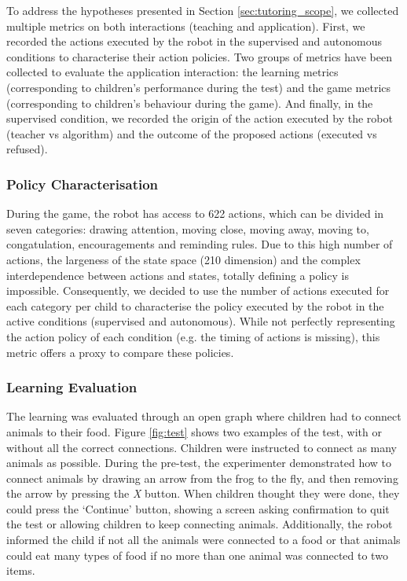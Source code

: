 To address the hypotheses presented in Section \ref{sec:tutoring_scope}, we collected multiple metrics on both interactions (teaching and application). First, we recorded the actions executed by the robot in the supervised and autonomous conditions to characterise their action policies. Two groups of metrics have been collected to evaluate the application interaction: the learning metrics (corresponding to children's performance during the test) and the game metrics (corresponding to children's behaviour during the game). And finally, in the supervised condition, we recorded the origin of the action executed by the robot (teacher vs algorithm) and the outcome of the proposed actions (executed vs refused).

\subsubsection{Policy Characterisation}

During the game, the robot has access to 622 actions, which can be divided in seven categories: drawing attention, moving close, moving away, moving to, congatulation, encouragements and reminding rules. Due to this high number of actions, the largeness of the state space (210 dimension) and the complex interdependence between actions and states, totally defining a policy is impossible. Consequently, we decided to use the number of actions executed for each category per child to characterise the policy executed by the robot in the active conditions (supervised and autonomous). While not perfectly representing the action policy of each condition (e.g. the timing of actions is missing), this metric offers a proxy to compare these policies. 

\subsubsection{Learning Evaluation}
The learning was evaluated through an open graph where children had to connect animals to their food. Figure \ref{fig:test} shows two examples of the test, with or without all the correct connections. Children were instructed to connect as many animals as possible. During the pre-test, the experimenter demonstrated how to connect animals by drawing an arrow from the frog to the fly, and then removing the arrow by pressing the \textit{X} button. When children thought they were done, they could press the `Continue' button, showing a screen asking confirmation to quit the test or allowing children to keep connecting animals. Additionally, the robot informed the child if not all the animals were connected to a food or that animals could eat many types of food if no more than one animal was connected to two items. 

